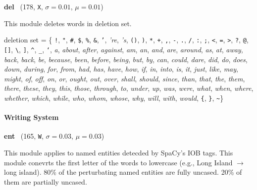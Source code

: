 \documentclass[11pt]{article}
\newenvironment{desc}{%
	\list{}{%
		\parsep 0.25em
		\topsep 0.25em
		\leftmargin 1em
		\rightmargin 0em
	}
	\item\relax
	\sloppy
}{%
	\endlist
}
\newcommand{\attr}[4]{%
	(#1, \texttt{#2}, $\sigma=#3$, $\mu=#4$)
}
\begin{document}
\noindent
\textbf{del}~\attr{178}{X}{0.01}{0.01}

\begin{desc}
	This module deletes words in deletion set.

	deletion set = \{
		\texttt{!},
		\texttt{"},
		\texttt{\#},
		\texttt{\$},
		\texttt{\%},
		\texttt{\&},
		\texttt{'},
		\textit{'re},
		\textit{'s},
		\texttt{()\fi},
		\texttt{)},
		\texttt{*},
		\texttt{+},
		\texttt{,},
		\texttt{-},
		\texttt{.},
		\texttt{/},
		\texttt{:},
		\texttt{;},
		\texttt{<},
		\texttt{=},
		\texttt{>},
		\texttt{?},
		\texttt{@},
		\texttt{[]\fi},
		\texttt{\textbackslash},
		\texttt{]},
		\texttt{\^{}},
		\texttt{\_},
		\texttt{`},
		\textit{a},
		\textit{about},
		\textit{after},
		\textit{against},
		\textit{am},
		\textit{an},
		\textit{and},
		\textit{are},
		\textit{around},
		\textit{as},
		\textit{at},
		\textit{away},
		\textit{back},
		\textit{back},
		\textit{be},
		\textit{because},
		\textit{been},
		\textit{before},
		\textit{being},
		\textit{but},
		\textit{by},
		\textit{can},
		\textit{could},
		\textit{dare},
		\textit{did},
		\textit{do},
		\textit{does},
		\textit{down},
		\textit{during},
		\textit{for},
		\textit{from},
		\textit{had},
		\textit{has},
		\textit{have},
		\textit{how},
		\textit{if},
		\textit{in},
		\textit{into},
		\textit{is},
		\textit{it},
		\textit{just},
		\textit{like},
		\textit{may},
		\textit{might},
		\textit{of},
		\textit{off},
		\textit{on},
		\textit{or},
		\textit{ought},
		\textit{out},
		\textit{over},
		\textit{shall},
		\textit{should},
		\textit{since},
		\textit{than},
		\textit{that},
		\textit{the},
		\textit{them},
		\textit{there},
		\textit{these},
		\textit{they},
		\textit{this},
		\textit{those},
		\textit{through},
		\textit{to},
		\textit{under},
		\textit{up},
		\textit{was},
		\textit{were},
		\textit{what},
		\textit{when},
		\textit{where},
		\textit{whether},
		\textit{which},
		\textit{while},
		\textit{who},
		\textit{whom},
		\textit{whose},
		\textit{why},
		\textit{will},
		\textit{with},
		\textit{would},
		\texttt{\{},
		\texttt{\}},
		\texttt{\textasciitilde}\}
\end{desc}

\paragraph{Writing System}\mbox{}

\noindent
\textbf{ent}~\attr{165}{W}{0.03}{0.03}

\begin{desc}
	This module applies to named entities detecded by SpaCy's IOB tags.
	This module conevrts the first letter of the words to lowercase (e.g., Long Island $\to$ long island).
	80\% of the perturbating named entities are fully uncased.
	20\% of them are partially uncased.
\end{desc}
\end{document}
